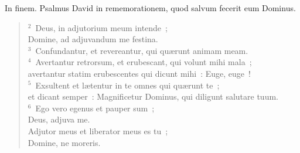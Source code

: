 \lettrine[lines=3,image=true,loversize=0.05,lraise=-0.03]{I}{}n finem. Psalmus David in rememorationem, quod salvum fecerit eum Dominus.
\begin{flushleft}\begin{verse}\vspace{6pt}${}^{2}$~Deus, in adjutorium meum intende~;\\ Domine, ad adjuvandum me festina.\\
${}^{3}$~Confundantur, et revereantur, qui qu\ae runt animam meam.\\
${}^{4}$~Avertantur retrorsum, et erubescant, qui volunt mihi mala~;\\ avertantur statim erubescentes qui dicunt mihi~: Euge, euge~!\\
${}^{5}$~Exsultent et l\ae tentur in te omnes qui qu\ae runt te~;\\ et dicant semper~: Magnificetur Dominus, qui diligunt salutare tuum.\\
${}^{6}$~Ego vero egenus et pauper sum~;\\ Deus, adjuva me.\\ Adjutor meus et liberator meus es tu~;\\ Domine, ne moreris.\end{verse}\end{flushleft}



